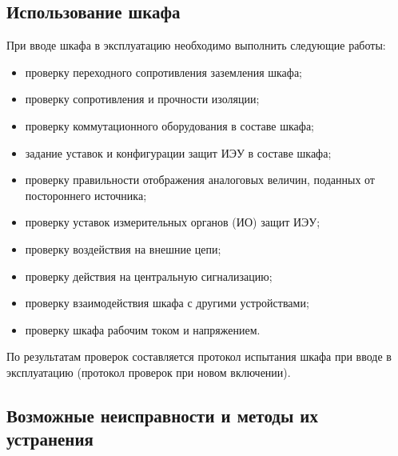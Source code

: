 {\color{unimain}\subsection{Использование шкафа}}

\begin{enumsub}
\item При вводе шкафа в эксплуатацию необходимо выполнить следующие работы:
  \begin{itemize}
  \item проверку переходного сопротивления заземления шкафа;
  \item проверку сопротивления и прочности изоляции;
  \item проверку коммутационного оборудования в составе шкафа;
  \item задание уставок и конфигурации защит ИЭУ в составе шкафа;
  \item проверку правильности отображения аналоговых величин, поданных от постороннего источника;
  \item проверку уставок измерительных органов (ИО) защит ИЭУ;
  \item проверку воздействия на внешние цепи;
  \item проверку действия на центральную сигнализацию;
  \item проверку взаимодействия шкафа с другими устройствами;
  \item проверку шкафа рабочим током и напряжением.
  \end{itemize}
\item По результатам проверок составляется протокол испытания шкафа при вводе в эксплуатацию (протокол проверок при новом включении).
\end{enumsub}

{\color{unimain}\subsection{Возможные неисправности и методы их устранения}}

